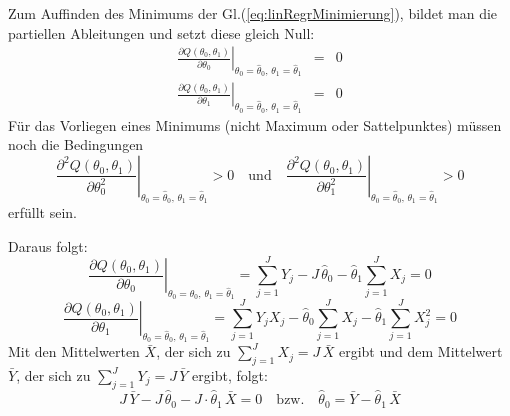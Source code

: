 Zum Auffinden des Minimums der Gl.(\ref{eq:linRegrMinimierung}), bildet man die
partiellen Ableitungen und setzt diese gleich Null:
\begin{equation}
\renewcommand*{\arraystretch}{1.5}
\begin{array}{lcc}
\left. {\frac{\partial Q(\theta _0 ,\theta _1 )}{\partial \theta_0 }} 
\right|_{\theta _0 = \hat{\theta}_0 ,\,\theta _1 = \hat{\theta}_1 } & = & 0  \\
\left. {\frac{\partial Q(\theta _0 ,\theta _1 )}{\partial \theta_1 }} 
\right|_{\theta _0 = \hat{\theta}_0 ,\,\theta _1 = \hat{\theta}_1 } & = & 0 
\end{array}
\label{GleichungssytemKostenfkt}
\end{equation}
Für das Vorliegen eines Minimums (nicht Maximum oder Sattelpunktes) müssen noch 
die Bedingungen
\begin{equation}
	\left. {\frac{\partial^2 Q(\theta _0 ,\theta _1 )}{\partial \theta_0^2 }} 
\right|_{\theta _0 = \hat{\theta}_0 ,\,\theta _1 = \hat{\theta}_1 } > 0 \quad 
\mathrm{und} \quad \left. { \frac{\partial^2 Q(\theta _0 ,\theta _1)}{ \partial \theta_1^2 }} 
\right|_{\theta _0 = \hat{\theta}_0 ,\,\theta _1 = \hat{\theta}_1 } > 0
\end{equation}
erfüllt sein.

Daraus folgt:
\[\left. \frac{\partial Q(\theta _0 ,\theta _1 )}{\partial \theta_0 } 
\right|_{\theta _0 = \hat{\theta}_0 ,\,\theta _1 = \hat{\theta}_1} = \sum\limits_{j = 1}^J {Y_j - J} \, \hat{\theta}_0 - \hat{\theta}_1 \sum\limits_{j = 1}^J {X_j = 0}
\]
\[
\left. \frac{\partial Q(\theta _0 ,\theta _1 )}{\partial \theta_1 } 
\right|_{\theta _0 = \hat{\theta}_0 ,\,\theta _1 = \hat{\theta}_1 }= \sum\limits_{j = 1}^J {Y_j X_j - \hat\theta_0 \sum\limits_{j = 1}^J {X_j - \hat\theta_1 \sum\limits_{j = 1}^J {X_j ^2 = 0} } }
\]
Mit den Mittelwerten $\bar X$, der sich zu $\sum\limits_{j = 1}^J {X_j } = J \, \bar {X}$ ergibt und dem Mittelwert $\bar Y$, der sich zu 
$\sum\limits_{j= 1}^J {Y_j } = J \, \bar {Y}$ ergibt, folgt:
\[
J \, \bar {Y} - J \, \hat{\theta}_0 - J \cdot \hat{\theta}_1 \, \bar {X} = 0 \quad
\mathrm{bzw.}\quad \hat{\theta}_0 = \bar {Y} - \hat{\theta}_1 \, \bar {X}
\]

